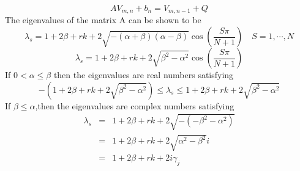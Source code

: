 \documentclass[12pt]{article}
\numberwithin{equation}{subsection} %
\begin{document}
 \begin{equation*}
 AV_{m,n} + b_{n}=V_{m,n-1}+Q
 \end{equation*}
The eigenvalues of the matrix A can be shown to be
%
%
\begin{equation*}
 \lambda_{s}  =
1+2\beta+rk+2\sqrt{-(\alpha+\beta)(\alpha-\beta)}\cos\left(\frac{S\pi}{N+1}\right)\quad
S  =  1,\cdots ,N
\end{equation*}
\begin{equation*}
\lambda_s=1+2\beta+rk+2\sqrt{\beta^2-\alpha^2}\cos\left(\frac{S\pi}{N+1}\right)
\end{equation*}
If $0<\alpha \leq \beta$ then the eigenvalues are real numbers
satisfying
\begin{equation*}
-(1+2\beta+rk+2\sqrt{\beta^2-\alpha^2})\leq \lambda_s \leq
1+2\beta+rk+2\sqrt{\beta^2-\alpha^2}
\end{equation*}
If $\beta \leq \alpha$,then the eigenvalues are complex numbers
satisfying
\begin{equation*}
\begin{array}{cccllllc}

\lambda_s&=&1+2\beta+rk+2\sqrt{-(-\beta^2-\alpha^2)}\\
&=&1+2\beta+rk+2\sqrt{\alpha^2-\beta^2}i\\
&=&1+2\beta+rk+2i\gamma_j\\
\end{array}
\end{equation*}
\end{document}
